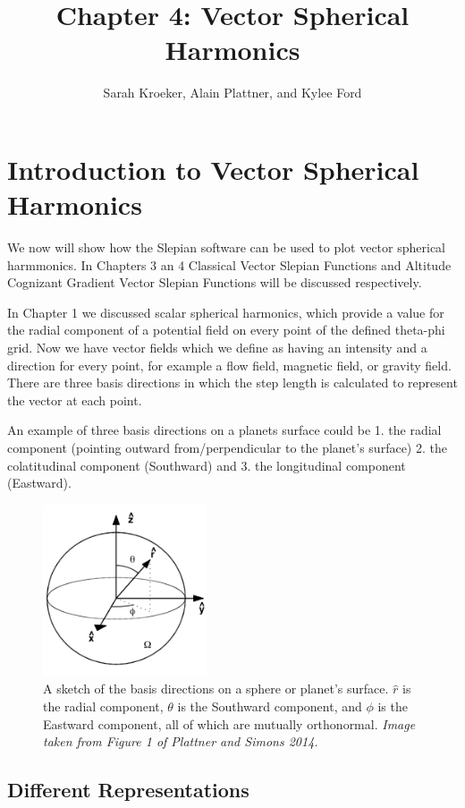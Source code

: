 \documentclass[11pt]{article}
\title{Chapter 4: Vector Spherical Harmonics}
\author{Sarah Kroeker, Alain Plattner, and Kylee Ford}
\begin{document}
\maketitle

\section{Introduction to Vector Spherical Harmonics}

We now will show how the Slepian software can be used to plot vector spherical harmmonics. In Chapters 3 an 4 Classical Vector Slepian Functions and Altitude Cognizant Gradient Vector Slepian Functions will be discussed respectively. 

In Chapter 1 we discussed scalar spherical harmonics, which provide a value for the radial component of a potential field on every point of the defined theta-phi grid. Now we have vector fields which we define as having an intensity and a direction for every point, for example a flow field, magnetic field, or gravity field. There are three basis directions in which the step length is calculated to represent the vector at each point.   

An example of three basis directions on a planets surface could be 1. the radial component (pointing outward from/perpendicular to the planet's surface) 2. the colatitudinal component (Southward) and 3. the longitudinal component (Eastward). 

\begin{figure}[H]
  \centering
  \includegraphics[height=2in]{figures/vectorsphere.png}
  \caption{A sketch of the basis directions on a sphere or planet's surface. $\hat{r}$ is the radial component, $\theta$ is the Southward component, and $\phi$ is the Eastward component, all of which are mutually orthonormal. \textit{Image taken from Figure 1 of Plattner and Simons 2014.}}
\label{figure1}
\end{figure}


\subsection{Different Representations}
\end{document}

